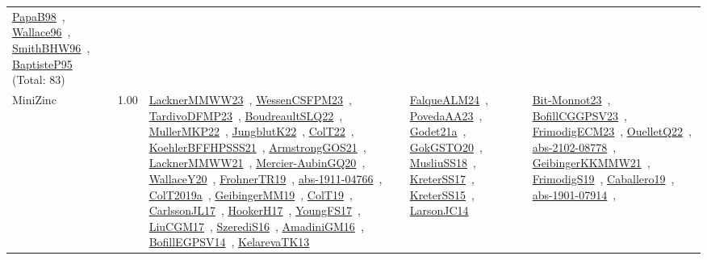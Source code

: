 {\begin{longtable}{p{3cm}r>{\raggedright\arraybackslash}p{6cm}>{\raggedright\arraybackslash}p{6cm}>{\raggedright\arraybackslash}p{8cm}}
\href{../works/PapaB98.pdf}{PapaB98}~\cite{PapaB98}, \href{../works/Wallace96.pdf}{Wallace96}~\cite{Wallace96}, \href{../works/SmithBHW96.pdf}{SmithBHW96}~\cite{SmithBHW96}, \href{../works/BaptisteP95.pdf}{BaptisteP95}~\cite{BaptisteP95} (Total: 83)\\
\index{MiniZinc}\index{CPSystems!MiniZinc}MiniZinc &  1.00 & \href{../works/LacknerMMWW23.pdf}{LacknerMMWW23}~\cite{LacknerMMWW23}, \href{../works/WessenCSFPM23.pdf}{WessenCSFPM23}~\cite{WessenCSFPM23}, \href{../works/TardivoDFMP23.pdf}{TardivoDFMP23}~\cite{TardivoDFMP23}, \href{../works/BoudreaultSLQ22.pdf}{BoudreaultSLQ22}~\cite{BoudreaultSLQ22}, \href{../works/MullerMKP22.pdf}{MullerMKP22}~\cite{MullerMKP22}, \href{../works/JungblutK22.pdf}{JungblutK22}~\cite{JungblutK22}, \href{../works/ColT22.pdf}{ColT22}~\cite{ColT22}, \href{../works/KoehlerBFFHPSSS21.pdf}{KoehlerBFFHPSSS21}~\cite{KoehlerBFFHPSSS21}, \href{../works/ArmstrongGOS21.pdf}{ArmstrongGOS21}~\cite{ArmstrongGOS21}, \href{../works/LacknerMMWW21.pdf}{LacknerMMWW21}~\cite{LacknerMMWW21}, \href{../works/Mercier-AubinGQ20.pdf}{Mercier-AubinGQ20}~\cite{Mercier-AubinGQ20}, \href{../works/WallaceY20.pdf}{WallaceY20}~\cite{WallaceY20}, \href{../works/FrohnerTR19.pdf}{FrohnerTR19}~\cite{FrohnerTR19}, \href{../works/abs-1911-04766.pdf}{abs-1911-04766}~\cite{abs-1911-04766}, \href{../works/ColT2019a.pdf}{ColT2019a}~\cite{ColT2019a}, \href{../works/GeibingerMM19.pdf}{GeibingerMM19}~\cite{GeibingerMM19}, \href{../works/ColT19.pdf}{ColT19}~\cite{ColT19}, \href{../works/CarlssonJL17.pdf}{CarlssonJL17}~\cite{CarlssonJL17}, \href{../works/HookerH17.pdf}{HookerH17}~\cite{HookerH17}, \href{../works/YoungFS17.pdf}{YoungFS17}~\cite{YoungFS17}, \href{../works/LiuCGM17.pdf}{LiuCGM17}~\cite{LiuCGM17}, \href{../works/SzerediS16.pdf}{SzerediS16}~\cite{SzerediS16}, \href{../works/AmadiniGM16.pdf}{AmadiniGM16}~\cite{AmadiniGM16}, \href{../works/BofillEGPSV14.pdf}{BofillEGPSV14}~\cite{BofillEGPSV14}, \href{../works/KelarevaTK13.pdf}{KelarevaTK13}~\cite{KelarevaTK13} & \href{../works/FalqueALM24.pdf}{FalqueALM24}~\cite{FalqueALM24}, \href{../works/PovedaAA23.pdf}{PovedaAA23}~\cite{PovedaAA23}, \href{../works/Godet21a.pdf}{Godet21a}~\cite{Godet21a}, \href{../works/GokGSTO20.pdf}{GokGSTO20}~\cite{GokGSTO20}, \href{../works/MusliuSS18.pdf}{MusliuSS18}~\cite{MusliuSS18}, \href{../works/KreterSS17.pdf}{KreterSS17}~\cite{KreterSS17}, \href{../works/KreterSS15.pdf}{KreterSS15}~\cite{KreterSS15}, \href{../works/LarsonJC14.pdf}{LarsonJC14}~\cite{LarsonJC14} & \href{../works/Bit-Monnot23.pdf}{Bit-Monnot23}~\cite{Bit-Monnot23}, \href{../works/BofillCGGPSV23.pdf}{BofillCGGPSV23}~\cite{BofillCGGPSV23}, \href{../works/FrimodigECM23.pdf}{FrimodigECM23}~\cite{FrimodigECM23}, \href{../works/OuelletQ22.pdf}{OuelletQ22}~\cite{OuelletQ22}, \href{../works/abs-2102-08778.pdf}{abs-2102-08778}~\cite{abs-2102-08778}, \href{../works/GeibingerKKMMW21.pdf}{GeibingerKKMMW21}~\cite{GeibingerKKMMW21}, \href{../works/FrimodigS19.pdf}{FrimodigS19}~\cite{FrimodigS19}, \href{../works/Caballero19.pdf}{Caballero19}~\cite{Caballero19}, \href{../works/abs-1901-07914.pdf}{abs-1901-07914}~\cite{abs-1901-07914}, 
\end{longtable}}
